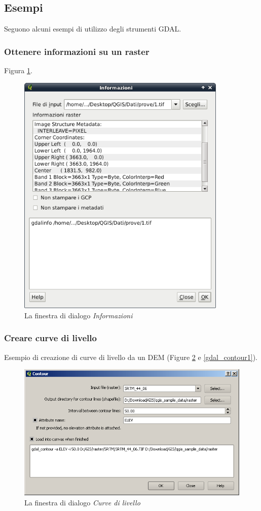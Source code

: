 {\subsection{Esempi}\label{gdal_examples}
Seguono alcuni esempi di utilizzo degli strumenti GDAL.
\subsubsection{Ottenere informazioni su un raster}

Figura \ref{gdalinfo}.

\begin{figure}
   \centering
   \caption{La finestra di dialogo \emph{Informazioni} \nixcaption}\label{gdalinfo}
   \includegraphics[clip=true, width=10cm]{plugins_gdaltools_images/gdalinfo}
\end{figure}

\subsubsection{Creare curve di livello}
Esempio di creazione di curve di livello da un DEM (Figure \ref{gdal_contour} e \ref{gdal_contour1}).
\begin{figure}
   \centering
   \caption{La finestra di dialogo \emph{Curve di livello} \nixcaption}\label{gdal_contour}
   \includegraphics[clip=true, width=12cm]{plugins_gdaltools_images/gdal_contour}
\end{figure}

}

